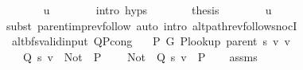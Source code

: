 \begin{isabellebody}
\ \ \ \ \ \ \isamarkupfalse%
\ u\isanewline
\ \ \ \ \ \ \isamarkupfalse%
\ {\isacharparenleft}{\kern0pt}intro\ {\isachardoublequoteopen}{}{\isachardot}{\kern0pt}hyps{\isachardoublequoteclose}{\isacharparenright}{\kern0pt}\isanewline
\ \ \ \ \isamarkupfalse%
\ \isamarkupfalse%
\ {\isacharquery}{\kern0pt}thesis\isanewline
\ \ \ \ \ \ \isamarkupfalse%
\ u\isanewline
\ \ \ \ \ \ \isamarkupfalse%
\ {\isacharparenleft}{\kern0pt}subst\ parent{\isacharunderscore}{\kern0pt}imp{\isacharunderscore}{\kern0pt}rev{\isacharunderscore}{\kern0pt}follow{\isacharparenright}{\kern0pt}\ {\isacharparenleft}{\kern0pt}auto\ intro{\isacharcolon}{\kern0pt}\ alt{\isacharunderscore}{\kern0pt}path{\isacharunderscore}{\kern0pt}rev{\isacharunderscore}{\kern0pt}follow{\isacharunderscore}{\kern0pt}snocI{\isacharparenright}{\kern0pt}\isanewline
\ \ \isamarkupfalse%
\isanewline
{}\isamarkupfalse%
%
\endisatagproof
{\isafoldproof}%
%
\isadelimproof
\isanewline
%
\endisadelimproof
%
\isadeliminvisible
\isanewline
%
\endisadeliminvisible
%
\isataginvisible
{}\isamarkupfalse%
\ {\isacharparenleft}{\kern0pt}\ alt{\isacharunderscore}{\kern0pt}bfs{\isacharunderscore}{\kern0pt}valid{\isacharunderscore}{\kern0pt}input{\isacharparenright}{\kern0pt}\ Q{\isacharunderscore}{\kern0pt}P{\isacharprime}{\kern0pt}{\isacharprime}{\kern0pt}{\isacharunderscore}{\kern0pt}cong{\isacharcolon}{\kern0pt}\isanewline
\ \ \ {\isachardoublequoteopen}P{\isacharprime}{\kern0pt}\ G{}\ {\isacharparenleft}{\kern0pt}P{\isacharunderscore}{\kern0pt}lookup\ {\isacharparenleft}{\kern0pt}parent\ s{\isacharparenright}{\kern0pt}\ v{\isacharparenright}{\kern0pt}\ v{\isachardoublequoteclose}\isanewline
\ \ \isanewline
\ \ \ \ {\isachardoublequoteopen}Q\ s\ v\ {\isacharequal}{\kern0pt}\ {\isacharparenleft}{\kern0pt}Not\ {\isasymcirc}\ P{\isacharprime}{\kern0pt}{\isacharprime}{\kern0pt}{\isacharparenright}{\kern0pt}{\isachardoublequoteclose}\isanewline
\ \ \ \ {\isachardoublequoteopen}{\isacharparenleft}{\kern0pt}Not\ {\isasymcirc}\ Q\ s\ v{\isacharparenright}{\kern0pt}\ {\isacharequal}{\kern0pt}\ P{\isacharprime}{\kern0pt}{\isacharprime}{\kern0pt}{\isachardoublequoteclose}%
\endisataginvisible
{\isafoldinvisible}%
%
\isadeliminvisible
\isanewline
%
\endisadeliminvisible
%
\isadelimproof
\ \ %
\endisadelimproof
%
\isatagproof
{}\isamarkupfalse%
\ assms\isanewline
\ \ \isamarkupfalse%

\end{isabellebody}
